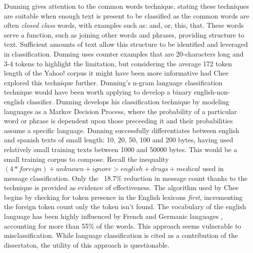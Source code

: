 \documentclass[twoside,11pt]{article}
\begin{document}
Dunning \citep{Dunning} gives attention to the common words technique, stating these techniques are suitable when enough text is present to be classified as the common words are often \textit{closed class} words, with examples such as: and, or, this, that. These words serve a function, such as joining other words and phrases, providing structure to text. Sufficient amounts of text allow this structure to be identified and leveraged in classification. Dunning uses counter examples that are 20-characters long and 3-4 tokens to highlight the limitation, but considering the average 172 token length of the Yahoo! corpus it might have been more informative had Chee explored this technique further.
Dunning's n-gram language classification technique would have been worth applying to develop a binary english-non-english classifier. Dunning develops his classification technique by modeling languages as a Markov Decision Process, where the probability of a particular word or phrase is dependent upon those preceeding it and their probabilities assume a specific language. Dunning successfully differentiates between english and spanish texts of small length: 10, 20, 50, 100 and 200 bytes, having used relatively small training texts between 1000 and 50000 bytes. This would be a small training corpus to compose.
Recall the inequality $(4 * foreign) + unknown + ignore > english + drugs + medical$ used in message classification. Only the ~18.7\% reduction in message count thanks to the technique is provided as evidence of effectiveness. The algorithm used by Chee begins by checking for token presence in the English lexicons \textit{first}, incrementing the foreign token count only the token isn't found. The vocabulary of the english language has been highly influenced by French and Germanic languages \citep{Wikipedia page for english}, accounting for more than 55\% of the words. This approach seems vulnerable to misclassification. While language classification is cited as a contribution of the dissertaton, the utility of this approach is questionable.
\end{document}
